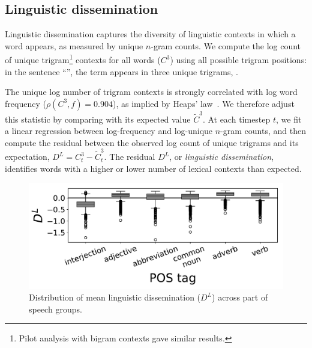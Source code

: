 \subsection{Linguistic dissemination}
\label{sec:linguistic_dissemination}

Linguistic dissemination captures the diversity of linguistic contexts in which a word appears, as measured by unique $n$-gram counts.
We compute the log count of unique trigram\footnote{Pilot analysis with bigram contexts gave similar results.} contexts for all words ($C^{3}$) using all possible trigram positions: in the sentence ``'', the term  appears in three unique trigrams, .

The unique log number of trigram contexts is strongly correlated with log word frequency ($\rho(C^{3}, f) = 0.904$), as implied by Heaps' law~\cite{egghe2007}.
We therefore adjust this statistic by comparing with its expected value $\tilde{C}^{3}$.
At each timestep $t$, we fit a linear regression between log-frequency and log-unique $n$-gram counts, and then compute the residual between the observed log count of unique trigrams and its expectation, $D^{L} = C^{3}_t - \tilde{C}^{3}_t$.
The residual $D^{L}$, or \emph{linguistic dissemination}, identifies words with a higher or lower number of lexical contexts than expected.

\begin{figure}[t!]
\centering
\includegraphics[width=\columnwidth]{figures/pos_DL_distribution.pdf}
\caption{Distribution of mean linguistic dissemination ($D^{L}$) across part of speech groups.}
\label{fig:pos-cd-dist}
\end{figure}

